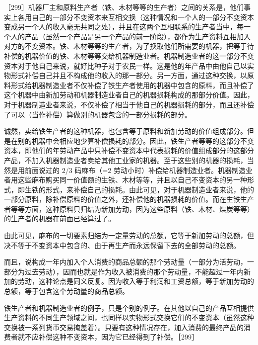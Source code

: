 ［299］机器厂主和原料生产者（铁、木材等等的生产者）之间的关系是，他们事实上各用自己的一部分不变资本来互相交换（这种情况和一个人的一部分不变资本变成另一个人的收入毫无共同之处），并且在这两个互相联系的生产者当中，每一个人的产品（虽然一个产品是另一个产品的前一阶段），都作为生产资料互相加入对方的不变资本。铁、木材等等的生产者，为了换取他们所需要的机器，把等于待补偿的机器价值的铁、木材等等交给机器制造业者。机器制造业者的这一部分不变资本对于他自己来说，就好比种子对于农民一样。这是他的年产品中由他自己以实物形式补偿自己并且不构成他的收入的那一部分。另一方面，通过这种交换，以原料形式给机器制造业者不仅补偿了铁生产者使用的机器中包含的原料，而且补偿了这个机器中由新加劳动和机器制造业者自己的机器损耗构成的那部分价值。因此，对于机器制造业者来说，不仅补偿了相当于他自己的机器损耗的部分，而且还补偿了可以（当作补偿）算做别的机器包含的一部分损耗的部分。

诚然，卖给铁生产者的这种机器，也包含等于原料和新加劳动的价值组成部分。但是在别的机器中会相应地少算补偿损耗的部分。因此，铁生产者等等的这部分不变资本，即他们的年劳动产品中只补偿不变资本中代表损耗的价值组成部分的这部分产品，不加入机器制造业者卖给其他工业家的机器。至于这些别的机器的损耗，当然是用前面说过的 2/3 码麻布（=2 劳动小时）补偿给机器制造业者。机器制造业者用这些麻布购买同一价值额的生铁、木材等等，并且以自己不变资本的另一种形式，即生铁的形式，来补偿自己的损耗。由此可见，对于机器制造业者来说，他的一部分原料，除补偿原料的价值之外，还补偿他的机器损耗的价值。而在生铁生产者等等方面，这种原料只归结为新加劳动，因为这些原料（铁、木材、煤炭等等）的生产者的机器在前面已经算过了。

由此可见，麻布的一切要素归结为一定量劳动的总额，它等于新加劳动的总额，但决不等于不变资本中包含的、由于再生产而永远保留下去的全部劳动的总额。

而且，说构成一年内加入个人消费的商品总额的那个劳动量（一部分为活劳动，一部分为过去劳动），因而也就是作为收入被消费的那个劳动量，不能超过一年内新加的劳动，这种论点是同义反复。因为收入等于利润和工资总额，等于新加劳动的总额，等于包含这个劳动量的商品总额。

铁生产者和机器制造业者的例子，只是个别的例子。在其他以自己的产品互相提供生产资料的不同生产领域之间，也同样以实物形式交换它们的不变资本（虽然这种交换被一系列货币交易掩盖着）。只要有这种情况存在，加入消费的最终产品的消费者就不应补偿这种不变资本，因为它已经得到了补偿。［299］

